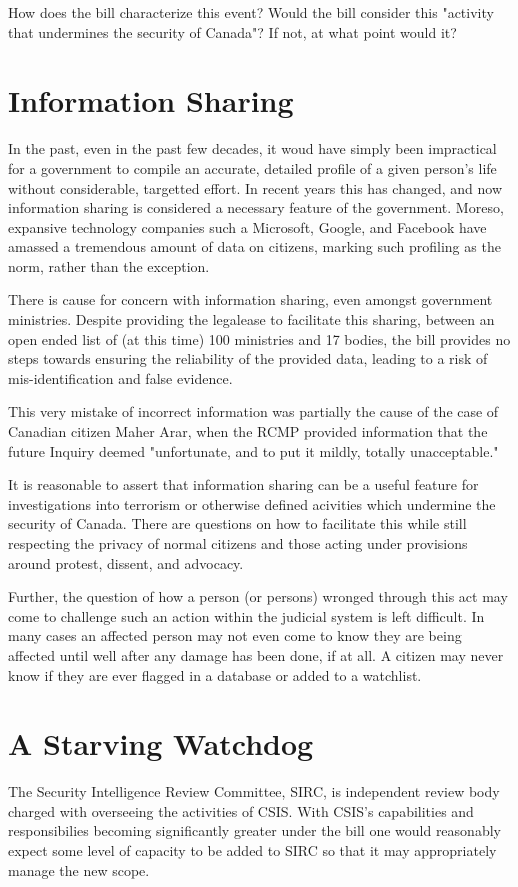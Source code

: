 \documentclass[a4paper, 11pt]{article} %
\begin{document}
How does the bill characterize this event? Would the bill consider this "activity that undermines the security of Canada"? If not, at what point would it?

\section*{Information Sharing}
In the past, even in the past few decades, it woud have simply been impractical for a government to compile an accurate, detailed profile of a given person's life without considerable, targetted effort. In recent years this has changed, and now information sharing is considered a necessary feature of the government. \cite{total-awareness} Moreso, expansive technology companies such a Microsoft, Google, and Facebook have amassed a tremendous amount of data on citizens, marking such profiling as the norm, rather than the exception.

There is cause for concern with information sharing, even amongst government ministries. Despite providing the legalease to facilitate this sharing, between an open ended list of (at this time) 100 ministries and 17 bodies, the bill provides no steps towards ensuring the reliability of the provided data, leading to a risk of mis-identification and false evidence.

This very mistake of incorrect information was partially the cause of the case of Canadian citizen Maher Arar, when the RCMP provided information that the future Inquiry deemed "unfortunate, and to put it mildly, totally unacceptable." \cite{arar}

It is reasonable to assert that information sharing can be a useful feature for investigations into terrorism or otherwise defined acivities which undermine the security of Canada. There are questions on how to facilitate this while still respecting the privacy of normal citizens and those acting under provisions around protest, dissent, and advocacy.

Further, the question of how a person (or persons) wronged through this act may come to challenge such an action within the judicial system is left difficult. In many cases an affected person may not even come to know they are being affected until well after any damage has been done, if at all. A citizen may never know if they are ever flagged in a database or added to a watchlist.

\section*{A Starving Watchdog}
The Security Intelligence Review Committee, SIRC, is independent review body charged with overseeing the activities of CSIS. With CSIS's capabilities and responsibilies becoming significantly greater under the bill one would reasonably expect some level of capacity to be added to SIRC so that it may appropriately manage the new scope.
\end{document}
